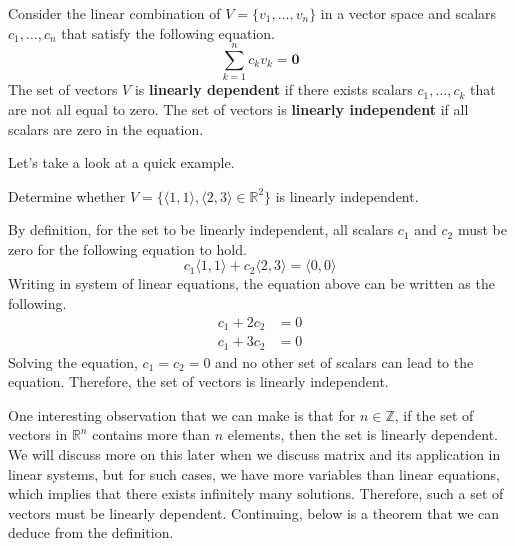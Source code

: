 \documentclass[../main.tex]{subfiles}
\begin{document}
\begin{definition}
Consider the linear combination of $V = \{ v_1, \ldots, v_n \}$
in a vector space and scalars $c_1, \ldots, c_n$ that satisfy the
following equation.
\[
\sum_{k = 1}^n c_k v_k = \mathbf{0}
\]
The set of vectors $V$ is \textbf{linearly dependent} if there exists
scalars $c_1, \ldots, c_k$ that are not all equal to zero. The set of
vectors is \textbf{linearly independent} if all scalars are zero in
the equation.
\end{definition}

Let's take a look at a quick example.

\begin{problem}
Determine whether $V = \{ \langle 1, 1 \rangle, \langle 2, 3\rangle
\in \mathbb{R}^2 \}$ is linearly independent.
\end{problem}
\begin{solution}
By definition, for the set to be linearly independent, all scalars
$c_1$ and $c_2$ must be zero for the following equation to hold.
\[
c_1 \langle 1, 1 \rangle + c_2 \langle 2, 3 \rangle
= \langle 0, 0 \rangle
\]
Writing in system of linear equations, the equation above can
be written as the following.
\begin{align*}
    c_1 + 2c_2 &= 0 \\
    c_1 + 3c_2 &= 0
\end{align*}
Solving the equation, $c_1 = c_2 = 0$ and no other set of scalars
can lead to the equation. Therefore, the set of vectors is linearly
independent.
\end{solution}

One interesting observation that we can make is that for $n \in
\mathbb{Z}$, if the set of vectors in $\mathbb{R}^n$ contains more
than $n$ elements, then the set is linearly dependent. We will
discuss more on this later when we discuss matrix and its application
in linear systems, but for such cases, we have more variables than
linear equations, which implies that there exists infinitely many
solutions. Therefore, such a set of vectors must be linearly
dependent. Continuing, below is a theorem that we can deduce from
the definition.
\end{document}
